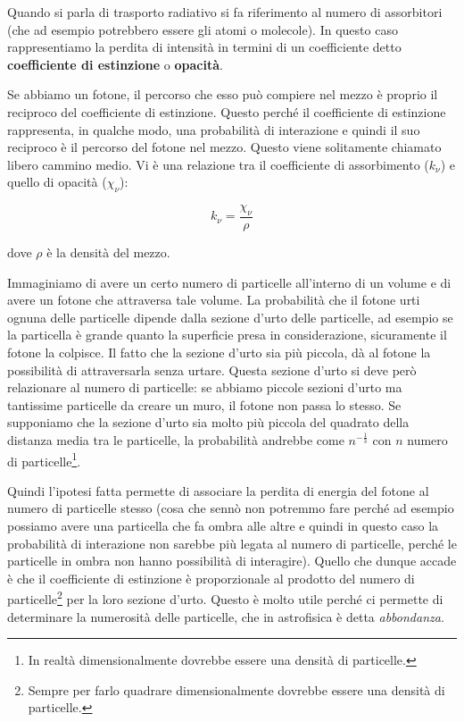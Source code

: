 Quando si parla di trasporto radiativo si fa riferimento al numero di assorbitori (che ad esempio potrebbero essere gli atomi o molecole). In questo caso rappresentiamo la perdita di intensità in termini di un coefficiente detto \textbf{coefficiente di estinzione} o \textbf{opacità}.

Se abbiamo un fotone, il percorso che esso può compiere nel mezzo è proprio il reciproco del coefficiente di estinzione. Questo perché il coefficiente di estinzione rappresenta, in qualche modo, una probabilità di interazione e quindi il suo reciproco è il percorso del fotone nel mezzo. Questo viene solitamente chiamato libero cammino medio. Vi è una relazione tra il coefficiente di assorbimento ($k_\nu$) e quello di opacità ($\chi_\nu$):

\begin{equation}
  k_\nu = \frac{\chi_\nu}{\rho}
\end{equation}

dove $\rho$ è la densità del mezzo.

Immaginiamo di avere un certo numero di particelle all'interno di un volume e di avere un fotone che attraversa tale volume. La probabilità che il fotone urti ognuna delle particelle dipende dalla sezione d'urto delle particelle, ad esempio se la particella è grande quanto la superficie presa in considerazione, sicuramente il fotone la colpisce. Il fatto che la sezione d'urto sia più piccola, dà al fotone la possibilità di attraversarla senza urtare. Questa sezione d'urto si deve però relazionare al numero di particelle: se abbiamo piccole sezioni d'urto ma tantissime particelle da creare un muro, il fotone non passa lo stesso. Se supponiamo che la sezione d'urto sia molto più piccola del quadrato della distanza media tra le particelle, la probabilità andrebbe come $n^{-\frac{1}{3}}$ con $n$ numero di particelle\footnote{In realtà dimensionalmente dovrebbe essere una densità di particelle.}.

Quindi l'ipotesi fatta permette di associare la perdita di energia del fotone al numero di particelle stesso (cosa che sennò non potremmo fare perché ad esempio possiamo avere una particella che fa ombra alle altre e quindi in questo caso la probabilità di interazione non sarebbe più legata al numero di particelle, perché le particelle in ombra non hanno possibilità di interagire). Quello che dunque accade è che il coefficiente di estinzione è proporzionale al prodotto del numero di particelle\footnote{Sempre per farlo quadrare dimensionalmente dovrebbe essere una densità di particelle.} per la loro sezione d'urto. Questo è molto utile perché ci permette di determinare la numerosità delle particelle, che in astrofisica è detta \textit{abbondanza}. 

